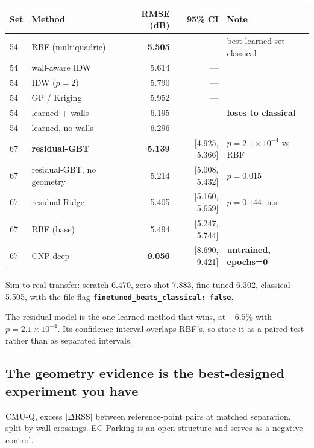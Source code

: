 \documentclass[10pt,a4paper]{article}
\newcommand{\B}[1]{\textcolor{bad}{\textbf{#1}}}
\newcommand{\G}[1]{\textcolor{good}{\textbf{#1}}}
\begin{document}
\begin{center}\small
\begin{tabular}{@{}llrrl@{}}
\toprule
Set & Method & RMSE (dB) & 95\% CI & Note \\ \midrule
54 & RBF (multiquadric) & \G{5.505} & --- & best learned-set classical \\
54 & wall-aware IDW & 5.614 & --- & \\
54 & IDW ($p{=}2$) & 5.790 & --- & \\
54 & GP / Kriging & 5.952 & --- & \\
54 & learned + walls & 6.195 & --- & \B{loses to classical} \\
54 & learned, no walls & 6.296 & --- & \\
\midrule
67 & \textbf{residual-GBT} & \G{5.139} & [4.925, 5.366] & $p=2.1\times10^{-4}$ vs RBF \\
67 & residual-GBT, no geometry & 5.214 & [5.008, 5.432] & $p=0.015$ \\
67 & residual-Ridge & 5.405 & [5.160, 5.659] & $p=0.144$, n.s. \\
67 & RBF (base) & 5.494 & [5.247, 5.744] & \\
67 & CNP-deep & \B{9.056} & [8.690, 9.421] & \B{untrained, epochs=0} \\
\bottomrule
\end{tabular}
\end{center}

Sim-to-real transfer: scratch 6.470, zero-shot 7.883, fine-tuned 6.302, classical 5.505,
with the file flag \B{\texttt{finetuned\_beats\_classical: false}}.

The residual model is the one learned method that wins, at $-6.5\%$ with
$p=2.1\times10^{-4}$. Its confidence interval overlaps RBF's, so state it as a paired
test rather than as separated intervals.

\subsection{The geometry evidence is the best-designed experiment you have}

CMU-Q, excess $|\Delta$RSS$|$ between reference-point pairs at matched separation, split
by wall crossings. EC Parking is an open structure and serves as a negative control.
\end{document}
